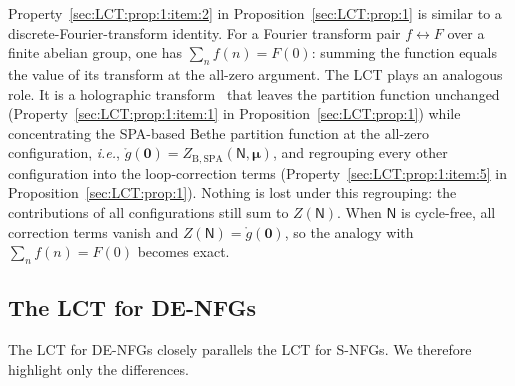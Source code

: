 \documentclass[journal]{IEEEtran}
\newcommand{\add}[1]{{\color{black}#1}}
\newcommand{\vect}[1]{ \bm{#1} }
\newcommand{\vmu}{ \vect{ \mu } }
\newcommand{\graphN}{ \mathsf{N} }
\newcommand{\ZBSPA}{ Z_{\mathrm{B,SPA}} }
\newcommand{\LCT}[1]{ \mathring{#1} }
\newcommand*{\ie}{\textit{i.e.}}
\begin{document}
\add{Property~\ref{sec:LCT:prop:1:item:2} in Proposition~\ref{sec:LCT:prop:1}
  is similar to a discrete-Fourier-transform identity. For a Fourier transform
  pair $f \leftrightarrow F$ over a finite abelian group, one has
  $\sum_{n} f(n) = F(0)$: summing the function equals the value of its
  transform at the all-zero argument. The LCT plays an analogous role. It is a
  holographic transform~\cite{AlBashabsheh2011} that leaves the partition
  function unchanged (Property~\ref{sec:LCT:prop:1:item:1} in
  Proposition~\ref{sec:LCT:prop:1}) while concentrating the SPA-based Bethe
  partition function at the all-zero configuration, \ie,
  $\LCT{g}(\vect{0}) = \ZBSPA(\graphN,\vmu)$, and regrouping every other
  configuration into the loop-correction terms
  (Property~\ref{sec:LCT:prop:1:item:5} in
  Proposition~\ref{sec:LCT:prop:1}). Nothing is lost under this regrouping:
  the contributions of all configurations still sum to $Z(\graphN)$. When
  $\graphN$ is cycle-free, all correction terms vanish and
  $Z(\graphN) = \LCT{g}(\vect{0})$, so the analogy with $\sum_{n} f(n) = F(0)$
  becomes exact.}

\subsection{The LCT for DE-NFGs}
\label{sec:LCT:DENFG:1}

\add{The LCT for DE-NFGs closely parallels the LCT for S-NFGs. We therefore highlight only the differences.}
\end{document}
